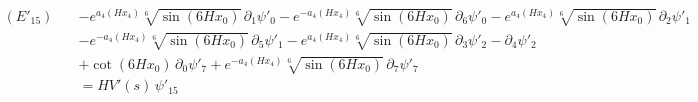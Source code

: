 \begin{align*}
(E'_{15})\quad & -e^{a_4\left(H x_4\right)} \sqrt[6]{\sin \left(6 H x_0\right)}\,\partial_{1}\psi'_{0} - e^{-a_4\left(H x_4\right)} \sqrt[6]{\sin \left(6 H x_0\right)}\,\partial_{6}\psi'_{0} - e^{a_4\left(H x_4\right)} \sqrt[6]{\sin \left(6 H x_0\right)}\,\partial_{2}\psi'_{1} \\
 &  - e^{-a_4\left(H x_4\right)} \sqrt[6]{\sin \left(6 H x_0\right)}\,\partial_{5}\psi'_{1} - e^{a_4\left(H x_4\right)} \sqrt[6]{\sin \left(6 H x_0\right)}\,\partial_{3}\psi'_{2} - \partial_{4}\psi'_{2} \\
 &  + \cot \left(6 H x_0\right)\,\partial_{0}\psi'_{7} + e^{-a_4\left(H x_4\right)} \sqrt[6]{\sin \left(6 H x_0\right)}\,\partial_{7}\psi'_{7} \\
 & = H V'(s)\,\psi'_{15}
\end{align*}
